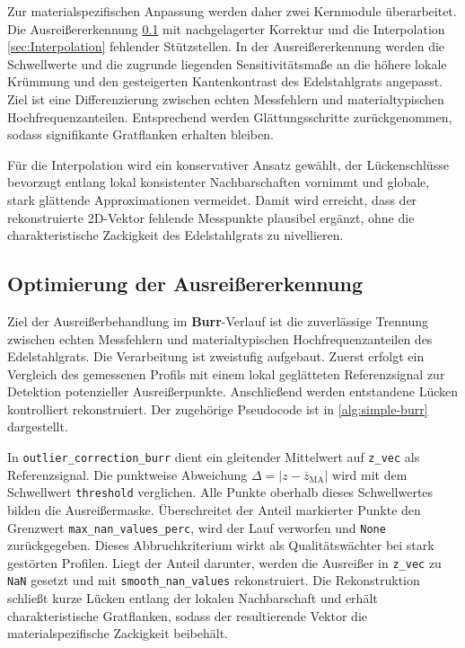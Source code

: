 Zur materialspezifischen Anpassung werden daher zwei Kernmodule überarbeitet. Die Ausreißererkennung \cref{sec:outlier-correction} mit nachgelagerter Korrektur und die Interpolation \cref{sec:Interpolation} fehlender Stützstellen. In der Ausreißererkennung werden die Schwellwerte und die zugrunde liegenden Sensitivitätsmaße an die höhere lokale Krümmung und den gesteigerten Kantenkontrast des Edelstahlgrats angepasst. Ziel ist eine Differenzierung zwischen echten Messfehlern und materialtypischen Hochfrequenzanteilen. Entsprechend werden Glättungsschritte zurückgenommen, sodass signifikante Gratflanken erhalten bleiben. 

Für die Interpolation wird ein konservativer Ansatz gewählt, der Lückenschlüsse bevorzugt entlang lokal konsistenter Nachbarschaften vornimmt und globale, stark glättende Approximationen vermeidet. Damit wird erreicht, dass der rekonstruierte 2D-Vektor fehlende Messpunkte plausibel ergänzt, ohne die charakteristische Zackigkeit des Edelstahlgrats zu nivellieren.

\subsection{Optimierung der Ausreißererkennung}
\label{sec:outlier-correction}

Ziel der Ausreißerbehandlung im \textbf{Burr}-Verlauf ist die zuverlässige Trennung zwischen echten Messfehlern und materialtypischen Hochfrequenzanteilen des Edelstahlgrats. Die Verarbeitung ist zweistufig aufgebaut. Zuerst erfolgt ein Vergleich des gemessenen Profils mit einem lokal geglätteten Referenzsignal zur Detektion potenzieller Ausreißerpunkte. Anschließend werden entstandene Lücken kontrolliert rekonstruiert. Der zugehörige Pseudocode ist in \cref{alg:simple-burr} dargestellt.

In \texttt{outlier\_correction\_burr} dient ein gleitender Mittelwert auf \texttt{z\_vec} als Referenzsignal. Die punktweise Abweichung \(\Delta=\lvert z-\overline{z}_{\text{MA}}\rvert\) wird mit dem Schwellwert \texttt{threshold} verglichen. Alle Punkte oberhalb dieses Schwellwertes bilden die Ausreißermaske. Überschreitet der Anteil markierter Punkte den Grenzwert \texttt{max\_nan\_values\_perc}, wird der Lauf verworfen und \texttt{None} zurückgegeben. Dieses Abbruchkriterium wirkt als Qualitätswächter bei stark gestörten Profilen. Liegt der Anteil darunter, werden die Ausreißer in \texttt{z\_vec} zu \texttt{NaN} gesetzt und mit \texttt{smooth\_nan\_values} rekonstruiert. Die Rekonstruktion schließt kurze Lücken entlang der lokalen Nachbarschaft und erhält charakteristische Gratflanken, sodass der resultierende Vektor die materialspezifische Zackigkeit beibehält.

